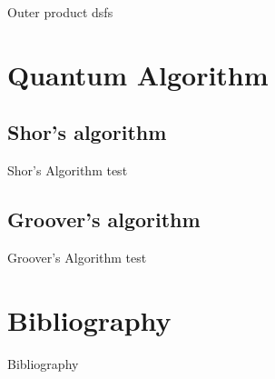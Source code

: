 \documentclass[svgnames,smaller,aspectratio=169]{beamer}
\begin{document}
\begin{frame}[fragile]{Outer product}
  dsfs
\end{frame}


\section{Quantum Algorithm}

\subsection{Shor's algorithm}

\begin{frame}[fragile]{Shor's Algorithm}
  test
\end{frame}


\subsection{Groover's algorithm}
\begin{frame}[fragile]{Groover's Algorithm}
test
\end{frame}

\section*{Bibliography}
\begin{frame}[allowframebreaks]{Bibliography}
\printbibliography
\end{frame}
\end{document}
